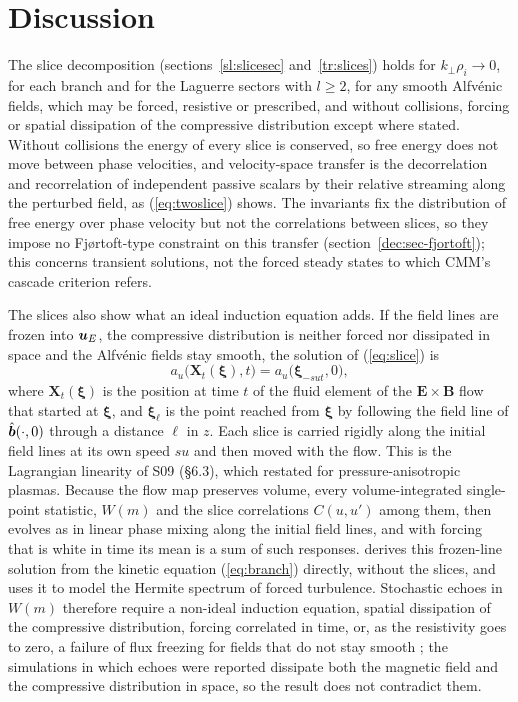 \section{Discussion}\label{sec:discussion}

The slice decomposition (sections~\ref{sl:slicesec} and~\ref{tr:slices}) holds for $k_\perp\rho_i\to0$, for each branch and for the Laguerre sectors with $l\ge2$, for any smooth Alfv\'enic fields, which may be forced, resistive or prescribed, and without collisions, forcing or spatial dissipation of the compressive distribution except where stated. Without collisions the energy of every slice is conserved, so free energy does not move between phase velocities, and velocity-space transfer is the decorrelation and recorrelation of independent passive scalars by their relative streaming along the perturbed field, as (\ref{eq:twoslice}) shows. The invariants fix the distribution of free energy over phase velocity but not the correlations between slices, so they impose no Fj{\o}rtoft-type constraint on this transfer (section~\ref{dec:sec-fjortoft}); this concerns transient solutions, not the forced steady states to which CMM's cascade criterion refers.

The slices also show what an ideal induction equation adds. If the field lines are frozen into $\boldsymbol u_E$, the compressive distribution is neither forced nor dissipated in space and the Alfv\'enic fields stay smooth, the solution of (\ref{eq:slice}) is
\begin{equation*}
  a_u\big(\boldsymbol X_t(\boldsymbol\xi),t\big)=a_u\big(\boldsymbol\xi_{-sut},0\big),
\end{equation*}
where $\boldsymbol X_t(\boldsymbol\xi)$ is the position at time $t$ of the fluid element of the $\boldsymbol E\times\boldsymbol B$ flow that started at $\boldsymbol\xi$, and $\boldsymbol\xi_\ell$ is the point reached from $\boldsymbol\xi$ by following the field line of $\hat{\boldsymbol b}(\cdot,0)$ through a distance $\ell$ in $z$. Each slice is carried rigidly along the initial field lines at its own speed $su$ and then moved with the flow. This is the Lagrangian linearity of S09 (\S6.3), which \citet{Kunz2015} restated for pressure-anisotropic plasmas. Because the flow map preserves volume, every volume-integrated single-point statistic, $W(m)$ and the slice correlations $C(u,u')$ among them, then evolves as in linear phase mixing along the initial field lines, and with forcing that is white in time its mean is a sum of such responses. \citet{KanekarPrep} derives this frozen-line solution from the kinetic equation (\ref{eq:branch}) directly, without the slices, and uses it to model the Hermite spectrum of forced turbulence. Stochastic echoes in $W(m)$ therefore require a non-ideal induction equation, spatial dissipation of the compressive distribution, forcing correlated in time, or, as the resistivity goes to zero, a failure of flux freezing for fields that do not stay smooth \citep{Eyink2013,Eyink2018,Jafari2026}; the simulations in which echoes were reported \citep{Meyrand2019} dissipate both the magnetic field and the compressive distribution in space, so the result does not contradict them.

